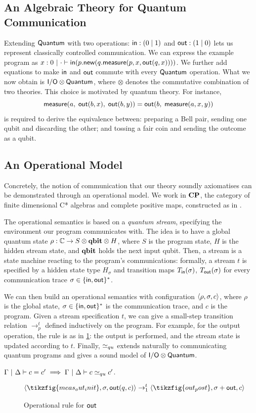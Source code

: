 \documentclass[sigplan, nonacm]{acmart}
\begin{document}
\subsection{An Algebraic Theory for Quantum Communication}
Extending $\mathsf{Quantum}$ with two operations: $\mathsf{in}: (0 \mid 1)$ and $\mathsf{out}: (1 \mid 0)$ lets us represent classically controlled communication. We can express the example program as $x: 0 \ | \ \cdot \vdash \mathsf{in}(p. \mathsf{new}(q. \mathsf{measure}(p, x, \mathsf{out}(q, x))))$. We further add equations to make $\mathsf{in}$ and $\mathsf{out}$ commute with every $\mathsf{Quantum}$ operation. What we now obtain is $\mathsf{I/O} \otimes \mathsf{Quantum}$, where $\otimes$ denotes the commutative combination of two theories. This choice is motivated by quantum theory. For instance,  
$$\mathsf{measure}(a,\; \mathsf{out}(b, x),\; \mathsf{out}(b, y)) = \mathsf{out}(b,\; \mathsf{measure}(a, x, y))$$
is required to derive the equivalence between: preparing a Bell pair, sending one qubit and discarding the other; and tossing a fair coin and sending the outcome as a qubit. 

\subsection{An Operational Model}
Concretely, the notion of communication that our theory soundly axiomatises can be demonstrated through an operational model. We work in $\mathbf{CP}$, the category of finite dimensional C* algebras and complete positive maps, constructed as in \cite{selinger_dagger_compact_closed_cat_cp_maps}. 

The operational semantics is based on a \emph{quantum stream}, specifying the environment our program communicates with. The idea is to have a global quantum state $\rho: \mathbb{C} \to S \otimes \mathbf{qbit} \otimes H$, where $S$ is the program state, $H$ is the hidden stream state, and $\mathbf{qbit}$ holds the next input qubit. Then, a stream is a state machine reacting to the program's communications: formally, a stream $t$ is specified by a hidden state type $H_\sigma$ and transition maps $T_{\mathsf{in}}(\sigma)$, $T_{\mathsf{out}}(\sigma)$ for every communication trace $\sigma \in \{\mathsf{in}, \mathsf{out}\}^*$. 

We can then build an operational semantics with configuration $\left\langle \rho, \sigma, c \right\rangle$, where $\rho$ is the global state, $\sigma \in \{\mathsf{in}, \mathsf{out}\}^*$ is the communication trace, and $c$ is the program. Given a stream specification $t$, we can give a small-step transition relation $\to^t_p$ defined inductively on the program. For example, for the output operation, the rule is as in \cref{fig:opsemout}: the output is performed, and the stream state is updated according to $t$. Finally, $\simeq_{qu}$ extends naturally to communicating quantum programs and gives a sound model of $\mathsf{I/O} \otimes \mathsf{Quantum}$. 
\begin{theorem}
  \label{thm:soundopsem}
  $\Gamma \ | \ \Delta \vdash c=c' \implies \Gamma \ | \ \Delta \vdash c \simeq_{qu} c'$.
\end{theorem}
\begin{figure}
  \[
  \config{\tikzfig{meas_out_init}}{\sigma}{\opout(q, c)} \to_1^t \config{\tikzfig{out_post}}{\sigma + \opout}{c} 
  \]
\caption{Operational rule for $\mathsf{out}$}
\label{fig:opsemout}
\end{figure}
\end{document}

